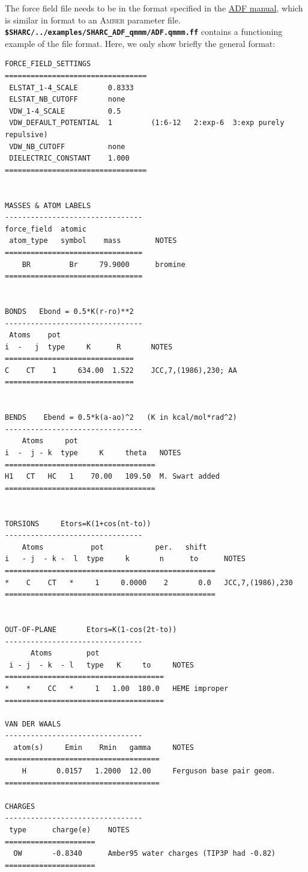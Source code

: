 \documentclass[a4paper,10pt,DIV=15,openany]{scrbook}
\newcommand{\link}[2]{\href{#1}{#2}}
\newcommand{\ttt}[1]{\textbf{\texttt{#1}}}
\newenvironment{example}{
  \setlength{\OuterFrameSep}{3pt}
  \vspace{0mm}
  \definecolor{shadecolor}{HTML}{E4F4FF}
  \begin{shaded}
}{
  \end{shaded}
}
\begin{document}
The force field file needs to be in the format specified in the \link{https://www.scm.com/doc/QMMM/ADF_QMMM/The_Force_Field_File.html}{ADF manual}, which is similar in format to an \textsc{Amber} parameter file.
\ttt{\$SHARC/../examples/SHARC\_ADF\_qmmm/ADF.qmmm.ff} contains a functioning example of the file format.
Here, we only show briefly the general format:
\begin{example}
  \begin{verbatim}
FORCE_FIELD_SETTINGS
=================================
 ELSTAT_1-4_SCALE       0.8333
 ELSTAT_NB_CUTOFF       none
 VDW_1-4_SCALE          0.5
 VDW_DEFAULT_POTENTIAL  1         (1:6-12   2:exp-6  3:exp purely repulsive)
 VDW_NB_CUTOFF          none
 DIELECTRIC_CONSTANT    1.000 
=================================


MASSES & ATOM LABELS
--------------------------------
force_field  atomic
 atom_type   symbol    mass        NOTES
================================
    BR         Br     79.9000      bromine
================================


BONDS   Ebond = 0.5*K(r-ro)**2    
--------------------------------
 Atoms    pot   
i  -   j  type     K      R       NOTES
==============================
C    CT    1     634.00  1.522    JCC,7,(1986),230; AA
==============================


BENDS    Ebend = 0.5*k(a-ao)^2   (K in kcal/mol*rad^2)
--------------------------------
    Atoms     pot 
i  -  j - k  type     K     theta   NOTES
===================================
H1   CT   HC   1    70.00   109.50  M. Swart added
===================================


TORSIONS     Etors=K(1+cos(nt-to))
--------------------------------
    Atoms           pot            per.   shift     
i   - j  - k -  l  type     k       n      to      NOTES
=================================================
*    C    CT   *     1     0.0000    2       0.0   JCC,7,(1986),230  
=================================================


OUT-OF-PLANE       Etors=K(1-cos(2t-to))
--------------------------------
      Atoms        pot      
 i - j  - k  - l   type   K     to     NOTES
=====================================
*    *    CC   *     1   1.00  180.0   HEME improper
=====================================

VAN DER WAALS
--------------------------------
  atom(s)     Emin    Rmin   gamma     NOTES
====================================
    H       0.0157   1.2000  12.00     Ferguson base pair geom.
====================================

CHARGES
--------------------------------
 type      charge(e)    NOTES
=====================
  OW       -0.8340      Amber95 water charges (TIP3P had -0.82)
=====================
\end{verbatim}
\end{example}
\end{document}
